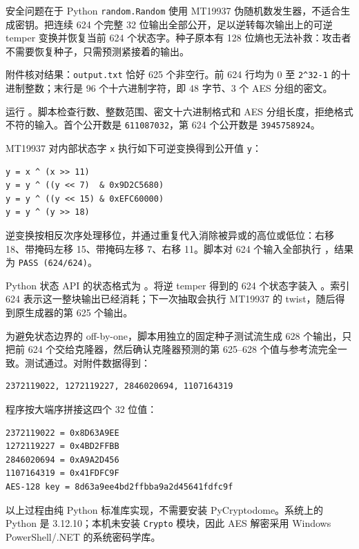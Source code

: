 安全问题在于 Python \texttt{random.Random} 使用 MT19937 伪随机数发生器，不适合生成密钥。把连续 624 个完整 32 位输出全部公开，足以逆转每次输出上的可逆 temper 变换并恢复当前 624 个状态字。种子原本有 128 位熵也无法补救：攻击者不需要恢复种子，只需预测紧接着的输出。

附件核对结果：\texttt{output.txt} 恰好 625 个非空行。前 624 行均为 0 至 \texttt{2\^{}32-1} 的十进制整数；末行是 96 个十六进制字符，即 48 字节、3 个 AES 分组的密文。

运行 \texttt{}。脚本检查行数、整数范围、密文十六进制格式和 AES 分组长度，拒绝格式不符的输入。首个公开数是 \texttt{611087032}，第 624 个公开数是 \texttt{3945758924}。

MT19937 对内部状态字 \texttt{x} 执行如下可逆变换得到公开值 \texttt{y}：

\begin{verbatim}
y = x ^ (x >> 11)
y = y ^ ((y << 7)  & 0x9D2C5680)
y = y ^ ((y << 15) & 0xEFC60000)
y = y ^ (y >> 18)
\end{verbatim}

逆变换按相反次序处理移位，并通过重复代入消除被异或的高位或低位：右移 18、带掩码左移 15、带掩码左移 7、右移 11。脚本对 624 个输入全部执行 \texttt{}，结果为 \texttt{PASS\ (624/624)}。

Python 状态 API 的状态格式为 \texttt{}。将逆 temper 得到的 624 个状态字装入 \texttt{}。索引 624 表示这一整块输出已经消耗；下一次抽取会执行 MT19937 的 twist，随后得到原生成器的第 625 个输出。

为避免状态边界的 off-by-one，脚本用独立的固定种子测试流生成 628 个输出，只把前 624 个交给克隆器，然后确认克隆器预测的第 625--628 个值与参考流完全一致。测试通过。对附件数据得到：

\begin{verbatim}
2372119022, 1272119227, 2846020694, 1107164319
\end{verbatim}

程序按大端序拼接这四个 32 位值：

\begin{verbatim}
2372119022 = 0x8D63A9EE
1272119227 = 0x4BD2FFBB
2846020694 = 0xA9A2D456
1107164319 = 0x41FDFC9F
AES-128 key = 8d63a9ee4bd2ffbba9a2d45641fdfc9f
\end{verbatim}

以上过程由纯 Python 标准库实现，不需要安装 PyCryptodome。系统上的 Python 是 3.12.10；本机未安装 \texttt{Crypto} 模块，因此 AES 解密采用 Windows PowerShell/.NET 的系统密码学库。

